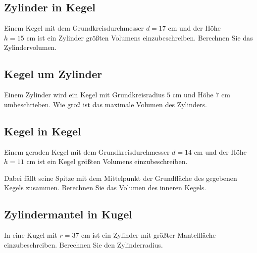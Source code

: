 




\subsection{Zylinder in Kegel}
Einem Kegel mit dem Grundkreisdurchmesser $d = 17 \text{ cm}$ und der Höhe $h
= 15 \text{ cm}$ ist ein Zylinder größten Volumens einzubeschreiben. Berechnen Sie das Zylindervolumen.


\subsection{Kegel um Zylinder}

Einem Zylinder wird ein Kegel mit Grundkreisradius $5 \text{ cm}$ und
Höhe $7 \text{ cm}$ umbeschrieben. Wie groß ist das maximale Volumen
des Zylinders.





\subsection{Kegel in Kegel}
Einem geraden Kegel mit dem Grundkreisdurchmesser $d = 14 \text{ cm}$ und der
Höhe $h = 11 \text{ cm}$
ist ein Kegel größten Volumens einzubeschreiben.

Dabei fällt seine Spitze mit dem Mittelpunkt der Grundfläche des
gegebenen Kegels zusammen.
Berechnen Sie das Volumen des inneren Kegels.





\subsection{Zylindermantel in Kugel}
In eine Kugel mit $r = 37 \text{ cm}$ ist ein Zylinder mit größter
Mantelfläche einzubeschreiben.
Berechnen Sie den Zylinderradius.

